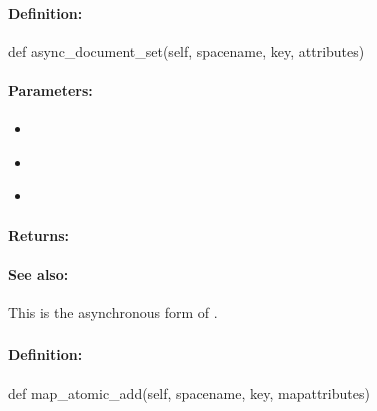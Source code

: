 \paragraph{Definition:}
\begin{pythoncode}
def async_document_set(self, spacename, key, attributes)
\end{pythoncode}

\paragraph{Parameters:}
\begin{itemize}[noitemsep]
\item {}\\

\item {}\\

\item {}\\

\end{itemize}

\paragraph{Returns:}


\paragraph{See also:}  This is the asynchronous form of .

\pagebreak
\subsubsection{}
\label{api:python:map_atomic_add}


\paragraph{Definition:}
\begin{pythoncode}
def map_atomic_add(self, spacename, key, mapattributes)
\end{pythoncode}

